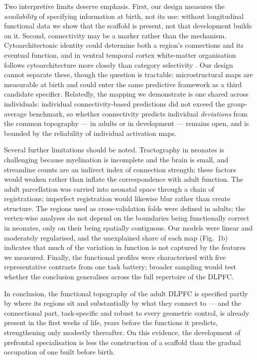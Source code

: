 \documentclass[11pt]{article}
\begin{document}
Two interpretive limits deserve emphasis. First, our design measures the
\emph{availability} of specifying information at birth, not its use:
without longitudinal functional data we show that the scaffold is present,
not that development builds on it. Second, connectivity may be a marker
rather than the mechanism. Cytoarchitectonic identity could determine both
a region's connections and its eventual function, and in ventral temporal
cortex white-matter organisation follows cytoarchitecture more closely than
category selectivity \citep{kubota2025}. Our design cannot separate these,
though the question is tractable: microstructural maps are measurable at
birth and could enter the same predictive framework as a third candidate
specifier. Relatedly, the mapping we demonstrate is one shared across
individuals: individual connectivity-based predictions did not exceed the
group-average benchmark, so whether connectivity predicts individual
\emph{deviations} from the common topography --- in adults or in
development --- remains open, and is bounded by the reliability of
individual activation maps.

Several further limitations should be noted. Tractography in neonates is
challenging because myelination is incomplete and the brain is small, and
streamline counts are an indirect index of connection strength; these
factors would weaken rather than inflate the correspondence with adult
function. The adult parcellation was carried into neonatal space through a
chain of registrations; imperfect registration would likewise blur rather
than create structure. The regions used as cross-validation folds were
defined in adults; the vertex-wise analyses do not depend on the boundaries
being functionally correct in neonates, only on their being spatially
contiguous. Our models were linear and moderately regularised, and the
unexplained share of each map (Fig.~1b) indicates that much of the
variation in function is not captured by the features we measured. Finally,
the functional profiles were characterised with five representative
contrasts from one task battery; broader sampling would test whether the
conclusion generalises across the full repertoire of the DLPFC.

In conclusion, the functional topography of the adult DLPFC is specified
partly by where its regions sit and substantially by what they connect to
--- and the connectional part, task-specific and robust to every geometric
control, is already present in the first weeks of life, years before the
functions it predicts, strengthening only modestly thereafter. On this
evidence, the development of prefrontal specialisation is less the
construction of a scaffold than the gradual occupation of one built before
birth.



\end{document}
